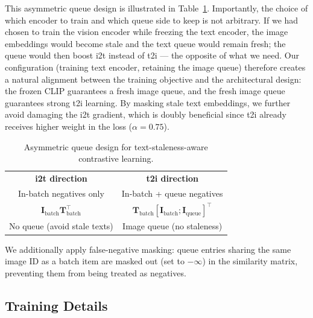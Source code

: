 \documentclass[10pt,leqno]{amsart}
\begin{document}
This asymmetric queue design is illustrated in Table~\ref{tab:queue}. Importantly, the choice of which encoder to train and which queue side to keep is not arbitrary. If we had chosen to train the vision encoder while freezing the text encoder, the image embeddings would become stale and the text queue would remain fresh; the queue would then boost i2t instead of t2i --- the opposite of what we need. Our configuration (training text encoder, retaining the image queue) therefore creates a natural alignment between the training objective and the architectural design: the frozen CLIP guarantees a fresh image queue, and the fresh image queue guarantees strong t2i learning. By masking stale text embeddings, we further avoid damaging the i2t gradient, which is doubly beneficial since t2i already receives higher weight in the loss ($\alpha = 0.75$).

\begin{table}[h]
\centering
\caption{Asymmetric queue design for text-staleness-aware contrastive learning.}
\label{tab:queue}
\begin{tabular}{c|c}
\hline
\textbf{i2t direction} & \textbf{t2i direction} \\
In-batch negatives only & In-batch + queue negatives \\
\hline
$\mathbf{I}_{\text{batch}} \mathbf{T}_{\text{batch}}^{\top}$ & $\mathbf{T}_{\text{batch}} [\mathbf{I}_{\text{batch}}; \mathbf{I}_{\text{queue}}]^{\top}$ \\
No queue (avoid stale texts) & Image queue (no staleness) \\
\hline
\end{tabular}
\end{table}

We additionally apply false-negative masking: queue entries sharing the same image ID as a batch item are masked out (set to $-\infty$) in the similarity matrix, preventing them from being treated as negatives.

\subsection{Training Details}
\end{document}
